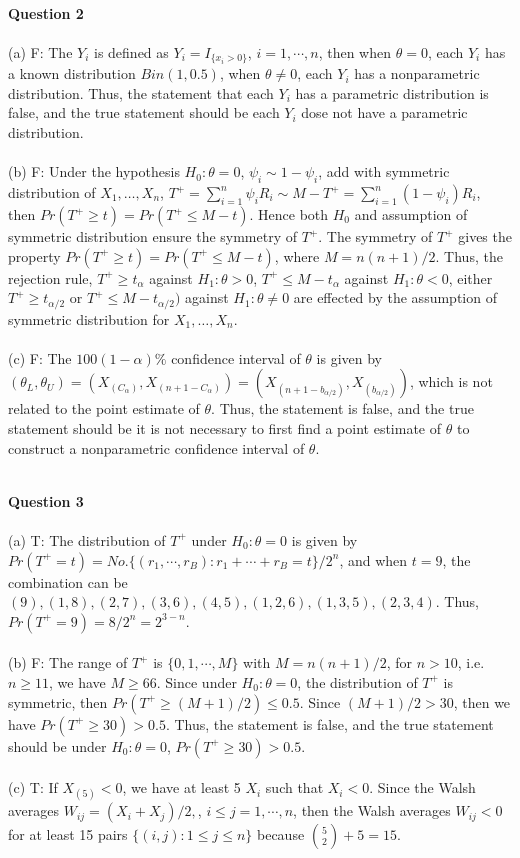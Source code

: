 \documentclass[12pt,a4paper]{article}
\begin{document}
~\\
\indent \textbf{Question 2}\\
~\\
(a) F: The $Y_{i}$ is defined as $Y_{i}=I_{\{x_{i}>0\}}$, $i=1,\cdots,n$, then when  $\theta =0$, each $Y_{i}$ has a known distribution $Bin(1,0.5)$, when $\theta \neq 0$, each $Y_{i}$ has a nonparametric distribution. Thus, the statement that each $Y_{i}$ has a parametric distribution is false, and the true statement should be each $Y_{i}$ dose not have a parametric distribution.\\
~\\ 
(b) F: Under the hypothesis $H_{0}:\theta =0$, $\psi_{i}\sim 1-\psi_{i}$, add with symmetric distribution of $X_{1},\dots,X_{n}$, $T^{+}=\sum_{i=1}^{n}\psi_{i}R_{i}\sim M-T^{+}=\sum_{i=1}^{n}(1-\psi_{i})R_{i}$, then $Pr(T^{+}\geqslant t)=Pr(T^{+}\leqslant M- t)$. Hence both $H_{0}$ and assumption of symmetric distribution ensure the symmetry of $T^{+}$. The symmetry of $T^{+}$ gives the property $Pr(T^{+}\geqslant t)=Pr(T^{+}\leqslant M- t)$, where $M=n(n+1)/2$. Thus, the rejection rule, $T^{+}\geqslant t_{\alpha}$ against $H_{1}:\theta >0$, $T^{+}\leqslant M-t_{\alpha}$ against $H_{1}:\theta <0$, either $T^{+}\geqslant t_{\alpha /2}$ or $T^{+}\leqslant M- t_{\alpha /2})$ against $H_{1}:\theta \neq 0$ are effected by the assumption of symmetric distribution for $X_{1},\dots,X_{n}$.\\
~\\
(c) F: The $100(1-\alpha)\%$ confidence interval of $\theta$  is given by $(\theta_{L},\theta_{U})=(X_{(C_{\alpha})},X_{(n+1-C_{\alpha})})=(X_{(n+1-b_{\alpha /2})},X_{(b_{\alpha /2})})$, which is not related to the point estimate of $\theta$. Thus, the statement is false, and the true statement should be it is not necessary to first find a point estimate of $\theta$ to construct a nonparametric confidence interval of $\theta$.

~\\
\indent \textbf{Question 3}\\
~\\
(a) T: The distribution of $T^{+}$ under $H_{0}:\theta =0$ is given by $Pr(T^{+}=t)=No.\{(r_{1},\cdots,r_{B}):r_{1}+\cdots+r_{B}=t\}/2^{n}$, and when $t=9$, the combination can be $(9),(1,8),(2,7),(3,6),(4,5),(1,2,6),(1,3,5),(2,3,4)$. Thus, $Pr(T^{+}=9)=8/2^{n}=2^{3-n}$.\\
~\\
(b) F: The range of $T^{+}$ is $\{0,1,\cdots,M\}$ with $M=n(n+1)/2$, for $n>10$, i.e. $n\geqslant 11$, we have $M\geqslant 66$. Since under $H_{0}:\theta =0$, the distribution of $T^{+}$ is symmetric, then $Pr(T^{+}\geqslant (M+1)/2)\leqslant 0.5$. Since $(M+1)/2>30$, then we have $Pr(T^{+}\geqslant 30)> 0.5$. Thus, the statement is false, and the true statement should be under $H_{0}:\theta=0$, $Pr(T^{+}\geqslant 30)> 0.5$.\\
~\\
(c) T: If $X_{(5)}<0$, we have at least 5 $X_{i}$ such that $X_{i}<0$. Since the Walsh averages $W_{ij}=(X_{i}+X_{j})/2,$, $i\leqslant j=1,\cdots,n$, then the Walsh averages $W_{ij}<0$ for at least 15 pairs $\{(i,j):1\leqslant j\leqslant n\}$ because ${5 \choose 2}+5=15$.
\end{document}
